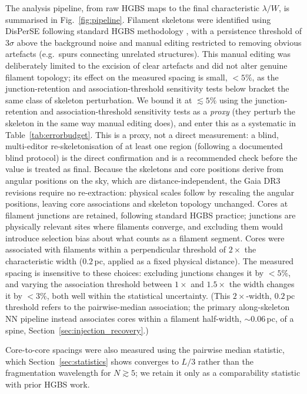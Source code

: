 \documentclass[usenatbib,twoside,twocolumn]{mnras}
\begin{document}
The analysis pipeline, from raw HGBS maps to the final characteristic $\lambda/W$, is summarised in Fig.~\ref{fig:pipeline}. Filament skeletons were identified using DisPerSE \citep{Sousbie2011} following standard HGBS methodology \citep{Arzoumanian2011}, with a persistence threshold of $3\sigma$ above the background noise and manual editing restricted to removing obvious artefacts (e.g.\ spurs connecting unrelated structures). This manual editing was deliberately limited to the excision of clear artefacts and did not alter genuine filament topology; its effect on the measured spacing is small, $<5\%$, as the junction-retention and association-threshold sensitivity tests below bracket the same class of skeleton perturbation. We bound it at $\lesssim5\%$ using the junction-retention and association-threshold sensitivity tests as a \emph{proxy} (they perturb the skeleton in the same way manual editing does), and enter this as a systematic in Table~\ref{tab:errorbudget}. This is a proxy, not a direct measurement: a blind, multi-editor re-skeletonisation of at least one region (following a documented blind protocol) is the direct confirmation and is a recommended check before the value is treated as final. Because the skeletons and core positions derive from angular positions on the sky, which are distance-independent, the Gaia DR3 revisions require no re-extraction: physical scales follow by rescaling the angular positions, leaving core associations and skeleton topology unchanged. Cores at filament junctions are retained, following standard HGBS practice; junctions are physically relevant sites where filaments converge, and excluding them would introduce selection bias about what counts as a filament segment. Cores were associated with filaments within a perpendicular threshold of $2\times$ the characteristic width ($0.2$\,pc, applied as a fixed physical distance). The measured spacing is insensitive to these choices: excluding junctions changes it by $<5\%$, and varying the association threshold between $1\times$ and $1.5\times$ the width changes it by $<3\%$, both well within the statistical uncertainty. (This $2\times$-width, $0.2$\,pc threshold refers to the pairwise-median association; the primary along-skeleton NN pipeline instead associates cores within a filament half-width, $\sim0.06$\,pc, of a spine, Section~\ref{sec:injection_recovery}.)

Core-to-core spacings were also measured using the pairwise median statistic, which Section~\ref{sec:statistics} shows converges to $L/3$ rather than the fragmentation wavelength for $N\gtrsim5$; we retain it only as a comparability statistic with prior HGBS work.
\end{document}
